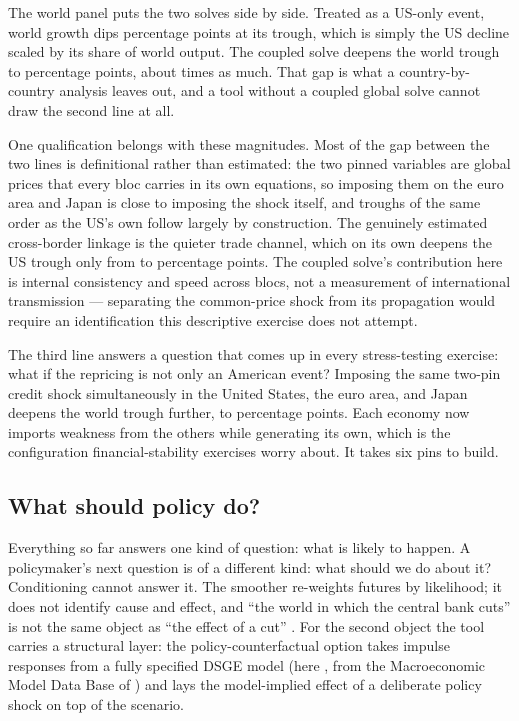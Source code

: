 \documentclass[11pt]{article}
\begin{document}
The world panel puts the two solves side by side. Treated as a US-only event, world growth
dips \WorldTroughUsoPp{} percentage points at its trough, which is simply the US decline
scaled by its share of world output. The coupled solve deepens the world trough to
\WorldTroughGlobPp{} percentage points, about \WorldTroughRatio{} times as much. That gap is what a
country-by-country analysis leaves out, and a tool without a coupled global solve cannot
draw the second line at all.

One qualification belongs with these magnitudes. Most of the gap between the two lines is
definitional rather than estimated: the two pinned variables are global prices that every bloc
carries in its own equations, so imposing them on the euro area and Japan is close to imposing
the shock itself, and troughs of the same order as the US's own follow largely by
construction. The
genuinely estimated cross-border linkage is the quieter trade channel, which on its own deepens
the US trough only from \TrueGdpGrowthMinPp{} to \USGdpTroughGlobPp{} percentage points. The
coupled solve's contribution here is internal consistency and speed across \NBlocs{} blocs, not a
measurement of international transmission --- separating the common-price shock from its
propagation would require an identification this descriptive exercise does not attempt.

The third line answers a question that comes up in every stress-testing exercise: what if
the repricing is not only an American event? Imposing the same two-pin credit shock
simultaneously in the United States, the euro area, and Japan deepens the world trough
further, to \WorldTroughJointPp{} percentage points. Each economy now imports weakness from
the others while generating its own, which is the configuration financial-stability
exercises worry about. It takes six pins to build.

\subsection{What should policy do?}\label{sec:counterfactual}

Everything so far answers one kind of question: what is likely to happen. A policymaker's
next question is of a different kind: what should we do about it? Conditioning cannot answer
it. The smoother re-weights futures by likelihood; it does not identify cause and effect, and
``the world in which the central bank cuts'' is not the same object as ``the effect of a
cut'' \citep{AntolinDiazPetrellaRubioRamirez2021}. For the second object the tool carries a
structural layer: the policy-counterfactual option takes impulse responses from a fully
specified DSGE model (here \citealp{SmetsWouters2007}, from the Macroeconomic Model Data Base
of \citealp{WielandCwikMuellerSchmidtWolters2012}) and lays the model-implied effect of a
deliberate policy shock on top of the scenario.
\end{document}
